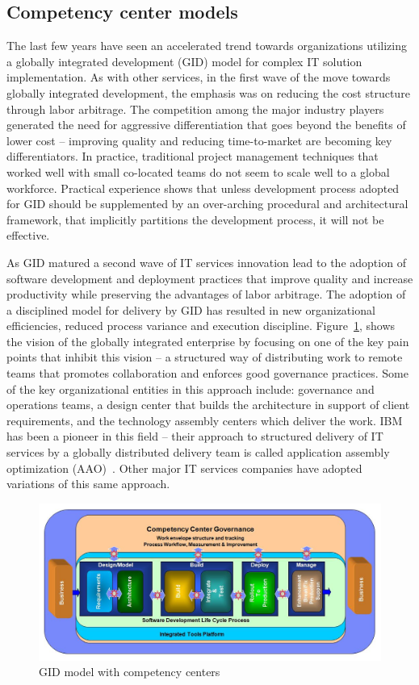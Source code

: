 \subsection{Competency center models}
The last few years have seen an accelerated trend towards organizations utilizing a globally integrated development (GID) model for complex IT solution implementation. As with other services, in the first wave of the move towards globally integrated development, the emphasis was on reducing the cost structure through labor arbitrage.  The competition among the major industry players generated the need for aggressive differentiation that goes beyond the benefits of lower cost -- improving quality and reducing time-to-market are becoming key differentiators. In practice, traditional project management techniques that worked well with small co-located teams do not seem to scale well to a global workforce. Practical experience shows that unless development process adopted for GID should be supplemented by an over-arching procedural and architectural framework, that implicitly partitions the development process, it will not be effective.

As GID matured a second wave of IT services innovation lead to the adoption of software development and deployment practices that improve quality and increase productivity while preserving the advantages of labor arbitrage.  The adoption of a disciplined model for delivery by GID has resulted in new organizational efficiencies, reduced process variance and execution discipline. Figure~\ref{glofig1}, shows the vision of the globally integrated enterprise by focusing on one of the key pain points that inhibit this vision – a structured way of distributing work to remote teams that promotes collaboration and enforces good governance practices.  Some of the key organizational entities in this approach include: governance and operations teams, a design center that builds the architecture in support of client requirements, and the technology assembly centers which deliver the work. IBM has been a pioneer in this field -- their approach to structured delivery of IT services by a globally distributed delivery team is called application assembly optimization (AAO)~\cite{gloaao}. Other major IT services companies have adopted variations of this same approach.

\begin{figure}[h]
\includegraphics[scale=0.2]{figs/glocomp.jpg}
\caption{GID model with competency centers}
\label{glofig1}
\end{figure}


